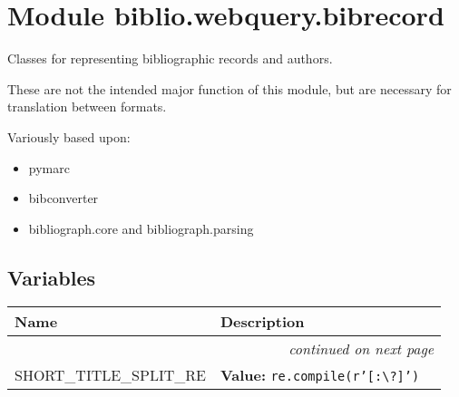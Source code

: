 %
%
%


\section{Module biblio.webquery.bibrecord}

    \label{biblio:webquery:bibrecord}

Classes for representing bibliographic records and authors.

These are not the intended major function of this module, but are necessary for translation
between formats.

Variously based upon:
\begin{itemize}
\item {} 
pymarc

\item {} 
bibconverter

\item {} 
bibliograph.core and bibliograph.parsing

\end{itemize}


  \subsection{Variables}

    \vspace{-1cm}
\hspace{\varindent}\begin{longtable}{|p{\varnamewidth}|p{\vardescrwidth}|l}
\cline{1-2}
\cline{1-2} \centering \textbf{Name} & \centering \textbf{Description}& \\
\cline{1-2}
\endhead\cline{1-2}\multicolumn{3}{r}{\small\textit{continued on next page}}\\\endfoot\cline{1-2}
\endlastfoot\raggedright S\-H\-O\-R\-T\-\_\-T\-I\-T\-L\-E\-\_\-S\-P\-L\-I\-T\-\_\-R\-E\- & \raggedright \textbf{Value:} 
{\tt re.compile(r'\texttt{[}:{\textbackslash}?\texttt{]}')}&\\
\cline{1-2}
\end{longtable}


